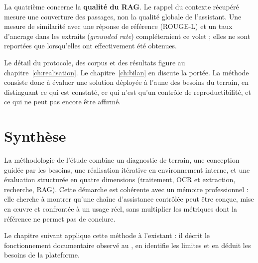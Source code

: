 La quatrième concerne la \textbf{qualité du RAG}. Le rappel du contexte récupéré mesure une couverture des passages, non la qualité globale de l'assistant. Une mesure de similarité avec une réponse de référence (ROUGE-L) et un taux d'ancrage dans les extraits (\textit{grounded rate}) compléteraient ce volet ; elles ne sont reportées que lorsqu'elles ont effectivement été obtenues.

Le détail du protocole, des corpus et des résultats figure au chapitre~\ref{ch:realisation}. Le chapitre~\ref{ch:bilan} en discute la portée. La méthode consiste donc à évaluer une solution déployée à l'aune des besoins du terrain, en distinguant ce qui est constaté, ce qui n'est qu'un contrôle de reproductibilité, et ce qui ne peut pas encore être affirmé.

\section{Synthèse}

La méthodologie de l'étude combine un diagnostic de terrain, une conception guidée par les besoins, une réalisation itérative en environnement interne, et une évaluation structurée en quatre dimensions (traitement, OCR et extraction, recherche, RAG). Cette démarche est cohérente avec un mémoire professionnel : elle cherche à montrer qu'une chaîne d'assistance contrôlée peut être conçue, mise en œuvre et confrontée à un usage réel, sans multiplier les métriques dont la référence ne permet pas de conclure.

Le chapitre suivant applique cette méthode à l'existant : il décrit le fonctionnement documentaire observé au \nomMinistere{}, en identifie les limites et en déduit les besoins de la plateforme.
